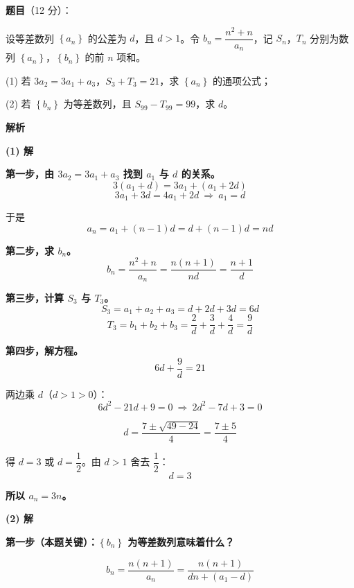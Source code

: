 \begin{answer}

\textbf{题目}（12 分）：

设等差数列 $\left\{a_n\right\}$ 的公差为 $d$，且 $d>1$。令 $b_n=\dfrac{n^{2}+n}{a_n}$，记 $S_n$，$T_n$ 分别为数列 $\left\{a_n\right\}$，$\left\{b_n\right\}$ 的前 $n$ 项和。

  (1) 若 $3a_2=3a_1+a_3$，$S_3+T_3=21$，求 $\left\{a_n\right\}$ 的通项公式；

  (2) 若 $\left\{b_n\right\}$ 为等差数列，且 $S_{99}-T_{99}=99$，求 $d$。

\textbf{解析}

\par\medskip

\textbf{(1) 解}

\textbf{第一步，由 $3a_2=3a_1+a_3$ 找到 $a_1$ 与 $d$ 的关系。}
\nopagebreak[4]
\[3\left(a_1+d\right)=3a_1+\left(a_1+2d\right)\]
\nopagebreak[4]
\[3a_1+3d=4a_1+2d\ \Longrightarrow\ a_1=d\]

于是
\nopagebreak[4]
\[a_n=a_1+(n-1)d=d+(n-1)d=nd\]

\textbf{第二步，求 $b_n$。}
\nopagebreak[4]
\[b_n=\frac{n^{2}+n}{a_n}=\frac{n(n+1)}{nd}=\frac{n+1}d\]

\textbf{第三步，计算 $S_3$ 与 $T_3$。}
\nopagebreak[4]
\[S_3=a_1+a_2+a_3=d+2d+3d=6d\]
\nopagebreak[4]
\[T_3=b_1+b_2+b_3=\frac2d+\frac3d+\frac4d=\frac9d\]

\textbf{第四步，解方程。}
\nopagebreak[4]
\[6d+\frac9d=21\]

两边乘 $d$（$d>1>0$）：
\nopagebreak[4]
\[6d^{2}-21d+9=0\ \Longrightarrow\ 2d^{2}-7d+3=0\]

\nopagebreak[4]
\[d=\frac{7\pm\sqrt{49-24}}4=\frac{7\pm5}4\]

得 $d=3$ 或 $d=\dfrac12$。由 $d>1$ 舍去 $\dfrac12$：
\nopagebreak[4]
\[d=3\]

\textbf{所以 $a_n=3n$。}

\par\medskip

\textbf{(2) 解}

\textbf{第一步（本题关键）：$\left\{b_n\right\}$ 为等差数列意味着什么？}

\nopagebreak[4]
\[b_n=\frac{n(n+1)}{a_n}=\frac{n(n+1)}{dn+\left(a_1-d\right)}\]


\end{answer}
